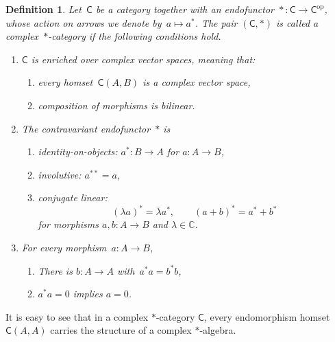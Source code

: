 \documentclass[reqno,T1,11pt]{amsproc}
\newcommand{\C}{\mathbb{C}}
\newcommand{\op}{\mathrm{op}}
\newcommand{\cat}[1]{\mathsf{#1}}		%
\theoremstyle{plain}
\newtheorem{defn}[thm]{Definition}
\theoremstyle{remark}
\numberwithin{equation}{section}
\begin{document}
\begin{defn}
    Let~$\cat{C}$ be a category together with an endofunctor~$*\,\colon \cat{C} \to \cat{C}^\op$,
    whose action on arrows we denote by~$a\mapsto a^*$. The pair $(\cat{C},*)$ is called a \emph{complex~$*$-category} if the following conditions hold.
\begin{enumerate}
    \item $\cat{C}$ is enriched over complex vector spaces, meaning that:
	    \begin{enumerate}
		    \item every homset~$\cat{C}(A,B)$ is a complex vector space,
		    \item composition of morphisms is bilinear.
	   \end{enumerate}
    \item The contravariant endofunctor~$*$ is
	    \begin{enumerate}
		    \item identity-on-objects: $a^* : B \to A$ for $a : A \to B$,
		    \item involutive: $a^{**} = a$,
		    \item conjugate linear:
			    \[
				    (\lambda a)^* = \overline{\lambda} a^*,\qquad (a+b)^* = a^* + b^*
			    \]
			    for morphisms $a, b : A \to B$ and $\lambda\in\C$.
	    \end{enumerate}
    \item For every morphism~$a : A \to B$,
	    \begin{enumerate}
		    \item There is $b :  A \to A$ with~$a^*a=b^*b$,
		    \item $a^*a=0$ implies $a = 0$.
	    \end{enumerate}
\end{enumerate}
\end{defn}

It is easy to see that in a complex $*$-category $\cat{C}$, every endomorphism homset $\cat{C}(A,A)$ carries the structure of a complex $*$-algebra. 
\end{document}
